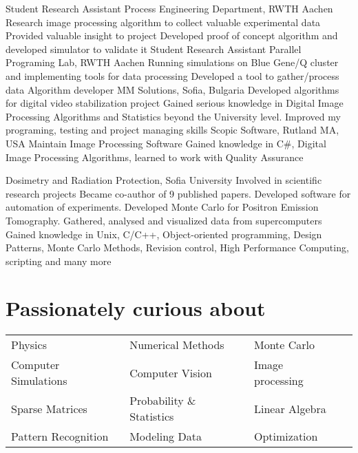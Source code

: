 {Student Research Assistant} 
{Process Engineering Department, RWTH Aachen}
{Research image processing algorithm to collect valuable experimental data}
{Provided valuable insight to project}
{Developed proof of concept algorithm and developed simulator to validate it}
{Student Research Assistant}
{Parallel Programing Lab, RWTH Aachen}
{Running simulations on Blue Gene/Q cluster and implementing tools for data processing}
{Developed a tool to gather/process data}
{}
{Algorithm developer}
{MM Solutions, Sofia, Bulgaria}
{Developed algorithms for digital video stabilization project}
{Gained serious knowledge in Digital Image Processing Algorithms and Statistics beyond the University level. Improved my programing, testing and project managing skills}
{}
{Scopic Software, Rutland MA, USA}
{Maintain Image Processing Software}
{Gained knowledge in C\#, Digital Image Processing Algorithms, learned to work with Quality Assurance}{}

{Dosimetry and Radiation Protection, Sofia University}
{Involved in scientific research projects}
{Became co-author of 9 published papers. Developed software for automation of experiments. Developed Monte Carlo for Positron Emission Tomography. Gathered, analysed and visualized data from supercomputers}
{Gained knowledge in Unix, C/C++, Object-oriented programming, Design Patterns, Monte Carlo Methods, Revision control, High Performance Computing, scripting and many more}
\section*{Passionately curious about}
\begin{tabular}{ l l l l}
Physics             & Numerical Methods         &
Monte Carlo         \\ Computer Simulations     & 
Computer Vision     & Image processing          \\
Sparse Matrices     & Probability \& Statistics & 
Linear Algebra      \\ Pattern Recognition       &   
Modeling Data       & Optimization              \\
\end{tabular}
